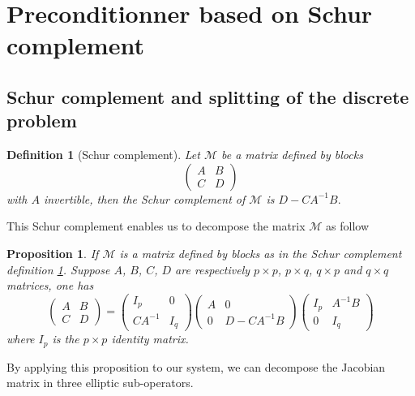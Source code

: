 \documentclass[a4paper, 11pt]{report}
\newtheorem{Proposition}{Proposition}
\newtheorem{Definition}{Definition}
\begin{document}
\section{Preconditionner based on Schur complement}

\subsection{Schur complement and splitting of the discrete problem}
\begin{Definition}[Schur complement]
Let $\mathscr{M}$ be a matrix defined by blocks \begin{equation*}
\begin{pmatrix}
A & B\\
C & D
\end{pmatrix}
\end{equation*} with $A$ invertible, then the Schur complement of $\mathscr{M}$ is $D-CA^{-1}B.$
\label{DEF_SCHUR}
\end{Definition}
This Schur complement enables us to decompose the matrix $\mathscr{M}$ as follow
\begin{Proposition}
If $\mathscr{M}$ is a matrix defined by blocks as in the Schur complement definition \ref{DEF_SCHUR}. Suppose $A$, $B$, $C$, $D$ are respectively $p\times p$, $p\times q$, $q\times p$ and $q\times q$ matrices, one has
\begin{equation*}
\begin{pmatrix}
A & B\\
C & D
\end{pmatrix}=\begin{pmatrix}
I_p & 0\\
CA^{-1}& I_q\end{pmatrix}
\begin{pmatrix}
A & 0\\
0 & D-CA^{-1}B\end{pmatrix}
\begin{pmatrix}
I_p & A^{-1}B\\
0 & I_q\end{pmatrix}
\end{equation*}
where $I_p$ is the $p\times p$ identity matrix.
\end{Proposition}
By applying this proposition to our system, we can decompose the Jacobian matrix in three elliptic sub-operators.
\end{document}
